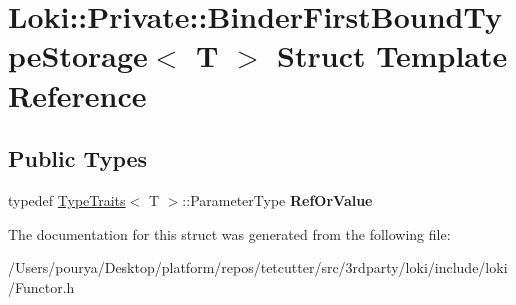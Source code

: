 \hypertarget{structLoki_1_1Private_1_1BinderFirstBoundTypeStorage}{}\section{Loki\+:\+:Private\+:\+:Binder\+First\+Bound\+Type\+Storage$<$ T $>$ Struct Template Reference}
\label{structLoki_1_1Private_1_1BinderFirstBoundTypeStorage}
\subsection*{Public Types}
\begin{DoxyCompactItemize}
\item 
\hypertarget{structLoki_1_1Private_1_1BinderFirstBoundTypeStorage_af623dce782532c50d24465a9317400e7}{}typedef \hyperlink{classLoki_1_1TypeTraits}{Type\+Traits}$<$ T $>$\+::Parameter\+Type {\bfseries Ref\+Or\+Value}\label{structLoki_1_1Private_1_1BinderFirstBoundTypeStorage_af623dce782532c50d24465a9317400e7}

\end{DoxyCompactItemize}


The documentation for this struct was generated from the following file\+:\begin{DoxyCompactItemize}
\item 
/\+Users/pourya/\+Desktop/platform/repos/tetcutter/src/3rdparty/loki/include/loki/Functor.\+h\end{DoxyCompactItemize}
